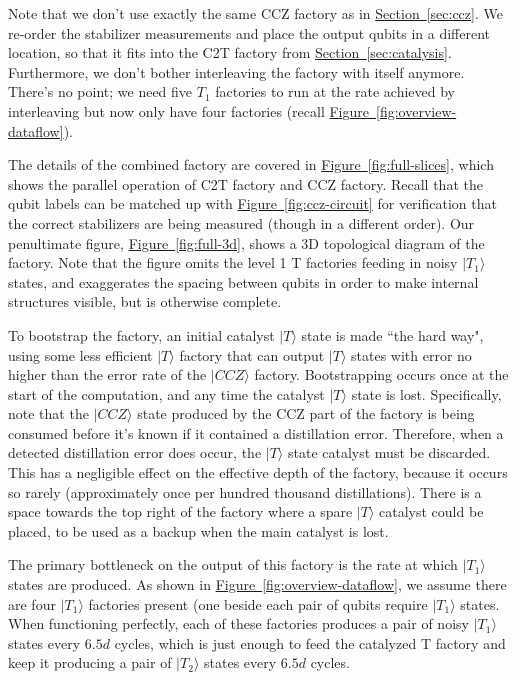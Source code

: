 \documentclass[superscriptaddress,notitlepage,longbibliography]{revtex4-1}
\renewcommand{\sec}[1]{\hyperref[sec:#1]{Section~\ref*{sec:#1}}}
\newcommand{\fig}[1]{\hyperref[fig:#1]{Figure~\ref*{fig:#1}}}
\begin{document}
Note that we don't use exactly the same CCZ factory as in \sec{ccz}.
We re-order the stabilizer measurements and place the output qubits in a different location, so that it fits into the C2T factory from \sec{catalysis}.
Furthermore, we don't bother interleaving the factory with itself anymore.
There's no point; we need five $T_1$ factories to run at the rate achieved by interleaving but now only have four factories (recall \fig{overview-dataflow}).

The details of the combined factory are covered in \fig{full-slices}, which shows the parallel operation of C2T factory and CCZ factory.
Recall that the qubit labels can be matched up with \fig{ccz-circuit} for verification that the correct stabilizers are being measured (though in a different order).
Our penultimate figure, \fig{full-3d}, shows a 3D topological diagram of the factory.
Note that the figure omits the level 1 T factories feeding in noisy $|T_1\rangle$ states, and exaggerates the spacing between qubits in order to make internal structures visible, but is otherwise complete.

To bootstrap the factory, an initial catalyst $|T\rangle$ state is made ``the hard way", using some less efficient $|T\rangle$ factory that can output $|T\rangle$ states with error no higher than the error rate of the $|CCZ\rangle$ factory.
Bootstrapping occurs once at the start of the computation, and any time the catalyst $|T\rangle$ state is lost.
Specifically, note that the $|CCZ\rangle$ state produced by the CCZ part of the factory is being consumed before it's known if it contained a distillation error.
Therefore, when a detected distillation error does occur, the $|T\rangle$ state catalyst must be discarded.
This has a negligible effect on the effective depth of the factory, because it occurs so rarely (approximately once per hundred thousand distillations).
There is a space towards the top right of the factory where a spare $|T\rangle$ catalyst could be placed, to be used as a backup when the main catalyst is lost.

The primary bottleneck on the output of this factory is the rate at which $|T_1\rangle$ states are produced.
As shown in \fig{overview-dataflow}, we assume there are four $|T_1\rangle$ factories present (one beside each pair of qubits require $|T_1\rangle$ states.
When functioning perfectly, each of these factories produces a pair of noisy $|T_1\rangle$ states every $6.5d$ cycles, which is just enough to feed the catalyzed T factory and keep it producing a pair of $|T_2\rangle$ states every $6.5d$ cycles.
\end{document}

